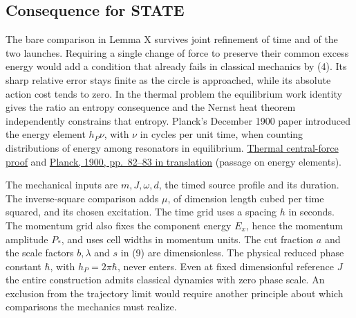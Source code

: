 \documentclass[11pt,a4paper]{article}
\begin{document}
\subsection{Consequence for STATE}\label{consequence-for-state}

The bare comparison in Lemma X survives joint refinement of time and of
the two launches. Requiring a single change of force to preserve their
common excess energy would add a condition that already fails in
classical mechanics by (4). Its sharp relative error stays finite as the
circle is approached, while its absolute action cost tends to zero. In
the thermal problem the equilibrium work identity gives the ratio an
entropy consequence and the Nernst heat theorem independently constrains
that entropy. Planck's December 1900 paper introduced the energy element
\(h_P\nu\), with \(\nu\) in cycles per unit time, when counting
distributions of energy among resonators in equilibrium.
\href{https://arivero.github.io/navstokgap/notes/thermal-action-central-force.html\#what-a-quarter-period-change-forces-on-every-newtonian-law}{Thermal
central-force proof} and
\href{https://www.ub.edu/hcub/hfq/sites/default/files/planck_1900_deduccio\%281\%29.pdf}{Planck,
1900, pp.~82--83 in translation} (passage on energy elements).

The mechanical inputs are \(m,J,\omega,d\), the timed source profile and
its duration. The inverse-square comparison adds \(\mu\), of dimension
length cubed per time squared, and its chosen excitation. The time grid
uses a spacing \(h\) in seconds. The momentum grid also fixes the
component energy \(E_x\), hence the momentum amplitude \(P_*\), and uses
cell widths in momentum units. The cut fraction \(a\) and the scale
factors \(b,\lambda\) and \(s\) in (9) are dimensionless. The physical
reduced phase constant \(\hbar\), with \(h_P=2\pi\hbar\), never enters.
Even at fixed dimensionful reference \(J\) the entire construction
admits classical dynamics with zero phase scale. An exclusion from the
trajectory limit would require another principle about which comparisons
the mechanics must realize.
\end{document}
